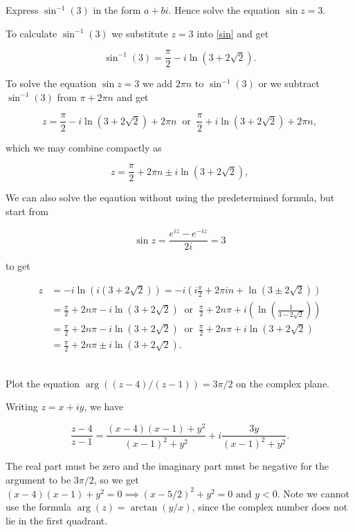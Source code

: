 \documentclass[english,a4paper,12pt]{report}
\begin{document}
{Express \(\sin ^{-1} (3)\) in the form \(a+bi\). Hence solve the equation \(\sin z = 3\).}
{To calculate \(\sin ^{-1} (3)\) we substitute \(z = 3\) into \cref{sin} and get
 
\begin{equation}
    \sin ^{-1} (3) = \frac{\pi }{2} - i \ln (3+2\sqrt{2} ). 
\end{equation}
 
To solve the equation \(\sin z = 3\) we add \(2\pi n\) to \(\sin ^{-1} (3)\) or we subtract \(\sin ^{-1} (3) \) from \( \pi + 2\pi n\) and get

\begin{equation}
    z = \frac{\pi }{2} - i \ln (3+2\sqrt{2} ) + 2\pi n ~\text { or } ~ \frac{\pi }{2} + i \ln (3+2\sqrt{2} ) + 2\pi n,
\end{equation}

which we may combine compactly as 

\begin{equation}
    z = \frac{\pi }{2} + 2\pi n \pm i \ln (3+2\sqrt{2} ),
\end{equation}

We can also solve the eqaution without using the predetermined formula, but start from

\begin{equation}
    \sin z = \frac{e^{iz}-e^{-iz}  }{2i} = 3 
\end{equation}

to get 

\begin{equation}
    \begin{aligned} 
    z &= -i \ln (i (3+2\sqrt{2} )) = -i \left(i \frac{\pi }{2} + 2\pi in + \ln (3 \pm 2\sqrt{2} ) \right) \\
    &= \frac{\pi }{2} + 2n\pi - i\ln (3+2\sqrt{2} ) ~\text { or } ~ \frac{\pi }{2} + 2n\pi +i\left( \ln (\frac{1}{3-2 \sqrt{2} } ) \right) \\
    &= \frac{\pi }{2} + 2n\pi -i \ln (3+2\sqrt{2} ) ~\text { or } ~ \frac{\pi }{2} + 2n\pi +i \ln (3+2\sqrt{2} )\\
    &=  \frac{\pi }{2} + 2n\pi \pm i \ln (3+2\sqrt{2} ).  
    \end{aligned} 
\end{equation}
~
} 
 

{Plot the equation \( \arg \left((z-4)/(z-1)\right)=3\pi /2 \) on the complex plane. }
{Writing \(z = x+iy\), we have 

\begin{equation}
    \frac{z-4}{z-1} = \frac{(x-4)(x-1)+y^2}{(x-1)^2+y^2} + i \frac{3y}{(x-1)^2+y^2}.  
\end{equation}

The real part must be zero and the imaginary part must be negative for the argument to be \(3\pi /2\), so we get \((x-4)(x-1)+y^2=0 \implies (x-5/2)^2+y^2 = 0 \text { and } y<0\). Note we cannot use the formula \(\arg (z) =  \arctan {\left(y /x\right) } \), since the complex number does not lie in the first quadrant.   
} 
\end{document}
